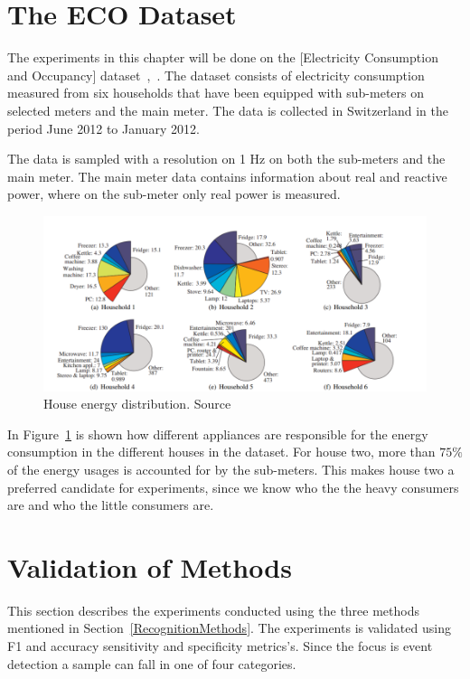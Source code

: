 \section{The ECO Dataset}
The experiments in this chapter will be done on the [Electricity Consumption and Occupancy] dataset~\citep{RefWorks:26},~\citep{RefWorks:27}. The dataset consists of electricity consumption measured from six households that have been equipped with sub-meters on selected meters and the main meter. The data is collected in Switzerland in the period June 2012 to January 2012. 

The data is sampled with a resolution on 1 Hz on both the sub-meters and the main meter. The main meter data contains information about real and reactive power, where on the sub-meter only real power is measured. 

\begin{figure}[H]
\centering
\includegraphics[width=1\textwidth]{billeder/ECOHouses.png}
\caption[House energy distribution.]{House energy distribution. Source \citep{RefWorks:26}}
\label{fig:EHD}
\end{figure}

In Figure~\ref{fig:EHD} is shown how different appliances are responsible for the energy consumption in the different houses in the  dataset. For house two, more than $75\%$ of the energy usages is accounted for by the sub-meters. This makes house two a preferred candidate for experiments, since we know who the the heavy consumers are and who the little consumers are.  

\section{Validation of Methods} 
\label{sec:VOM}
This section describes the experiments conducted using the three methods mentioned in Section~\ref{RecognitionMethods}. The experiments is validated using F1 and accuracy sensitivity and specificity metrics's. Since the focus is event detection a sample can fall in one of four categories. 

